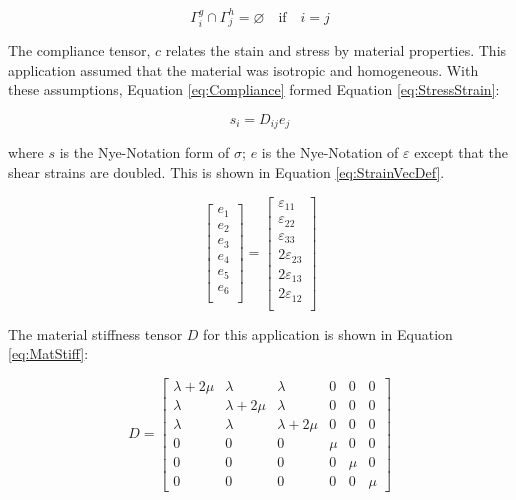 \documentclass[a4paper, 12pt]{article}
\begin{document}
\begin{equation} \label{eq:DNconf}
\Gamma^{g}_{i} \cap \Gamma^{h}_{j} = \varnothing \quad \text{if} \quad i=j
\end{equation}

The compliance tensor, $c$ relates the stain and stress by
material properties. This application assumed that the material
was isotropic and homogeneous. With these assumptions,
Equation \ref{eq:Compliance} formed Equation \ref{eq:StressStrain}:

\begin{equation} \label{eq:StressStrain}
s_{i} = D_{ij} e_{j}
\end{equation}

\noindent
where $s$ is the Nye-Notation form of $\sigma$; $e$ is the Nye-Notation
of $\varepsilon$ except that the shear strains are doubled. This
is shown in Equation \ref{eq:StrainVecDef}.

\begin{equation} \label{eq:StrainVecDef}
  \begin{bmatrix}
    e_1 \\
    e_2 \\
    e_3 \\
    e_4 \\
    e_5 \\
    e_6 \\
  \end{bmatrix}
  =
  \begin{bmatrix}
    \varepsilon_{11} \\
    \varepsilon_{22} \\
    \varepsilon_{33} \\

    2 \varepsilon_{23} \\
    2 \varepsilon_{13} \\
    2 \varepsilon_{12} \\
  \end{bmatrix}
\end{equation}

\noindent
The material stiffness tensor $D$ for this application
is shown in Equation \ref{eq:MatStiff}:

\begin{equation} \label{eq:MatStiff}
  D =
  \begin{bmatrix}
  \lambda+2\mu & \lambda      & \lambda      & 0 & 0 & 0 \\
  \lambda      & \lambda+2\mu & \lambda      & 0 & 0 & 0 \\
  \lambda      & \lambda      & \lambda+2\mu & 0 & 0 & 0 \\
  0 & 0 & 0 & \mu & 0 & 0 \\
  0 & 0 & 0 & 0 & \mu & 0 \\
  0 & 0 & 0 & 0 & 0 & \mu
  \end{bmatrix}
\end{equation}
\end{document}
